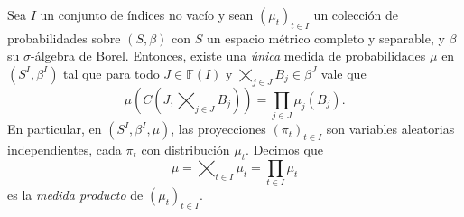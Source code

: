 
\begin{theorem}
	Sea $I$ un conjunto de índices no vacío y sean $(\mu_{t})_{t \in I}$ un colección de probabilidades sobre $(S, \beta)$ con $S$ un espacio métrico completo y separable, y $\beta$ su $\sigma$-álgebra de Borel. Entonces, existe una \textit{única} medida de probabilidades $\mu$ en $(S^{I}, \beta^{I})$ tal que para todo $J \in \mathbb{F}(I)$ y $\bigtimes_{j \in J} B_{j} \in \beta^{J}$ vale que
	\[ \mu \left( C \left( J, \bigtimes_{j \in J} B_{j} \right) \right) = \prod_{j \in J} \mu_{j}(B_{j}). \]
	En particular, en $(S^{I}, \beta^{I}, \mu)$, las proyecciones $(\pi_{t})_{t \in I}$ son variables aleatorias independientes, cada $\pi_{t}$ con distribución $\mu_{t}$. Decimos que
	\[ \mu = \bigtimes_{t \in I} \mu_{t} = \prod_{t \in I} \mu_{t} \]
	es la \textit{medida producto} de $(\mu_{t})_{t \in I}$.
\end{theorem}
